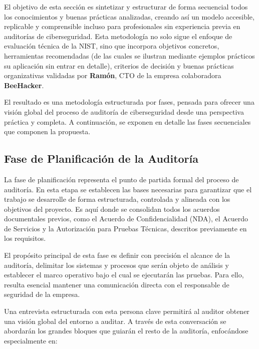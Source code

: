 \documentclass[a4paper, 11pt]{article}
\begin{document}
El objetivo de esta sección es sintetizar y estructurar de forma secuencial todos los conocimientos y buenas prácticas analizadas, creando así un modelo accesible, replicable y comprensible incluso para profesionales sin experiencia previa en auditorías de ciberseguridad. Esta metodología no solo sigue el enfoque de evaluación técnica de la NIST, sino que incorpora objetivos concretos, herramientas recomendadas (de las cuales se ilustran mediante ejemplos prácticos su aplicación sin entrar en detalle), criterios de decisión y buenas prácticas organizativas validadas por \textbf{Ramón}, CTO de la empresa colaboradora \textbf{BeeHacker}.

El resultado es una metodología estructurada por fases, pensada para ofrecer una visión global del proceso de auditoría de ciberseguridad desde una perspectiva práctica y completa. A continuación, se exponen en detalle las fases secuenciales que componen la propuesta.

\subsection{Fase de Planificación de la Auditoría}

La fase de planificación representa el punto de partida formal del proceso de auditoría. En esta etapa se establecen las bases necesarias para garantizar que el trabajo se desarrolle de forma estructurada, controlada y alineada con los objetivos del proyecto. Es aquí donde se consolidan todos los acuerdos documentales previos, como el Acuerdo de Confidencialidad (NDA), el Acuerdo de Servicios y la Autorización para Pruebas Técnicas, descritos previamente en los requisitos.

El propósito principal de esta fase es definir con precisión el alcance de la auditoría, delimitar los sistemas y procesos que serán objeto de análisis y establecer el marco operativo bajo el cual se ejecutarán las pruebas. Para ello, resulta esencial mantener una comunicación directa con el responsable de seguridad de la empresa.

Una entrevista estructurada con esta persona clave permitirá al auditor obtener una visión global del entorno a auditar. A través de esta conversación se abordarán los grandes bloques que guiarán el resto de la auditoría, enfocándose especialmente en:
\end{document}
